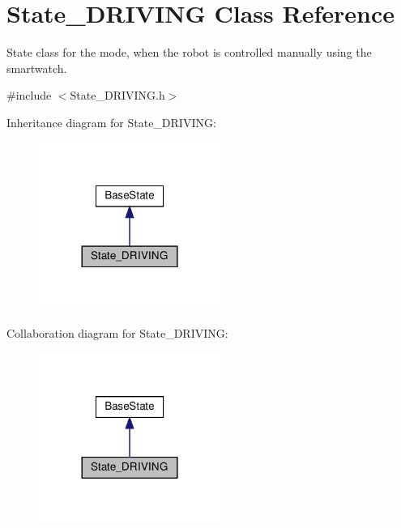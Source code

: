 \hypertarget{class_state___d_r_i_v_i_n_g}{}\section{State\+\_\+\+D\+R\+I\+V\+I\+NG Class Reference}
\label{class_state___d_r_i_v_i_n_g}


State class for the mode, when the robot is controlled manually using the smartwatch.  




{\ttfamily \#include $<$State\+\_\+\+D\+R\+I\+V\+I\+N\+G.\+h$>$}



Inheritance diagram for State\+\_\+\+D\+R\+I\+V\+I\+NG\+:\nopagebreak
\begin{figure}[H]
\begin{center}
\leavevmode
\includegraphics[width=168pt]{class_state___d_r_i_v_i_n_g__inherit__graph}
\end{center}
\end{figure}


Collaboration diagram for State\+\_\+\+D\+R\+I\+V\+I\+NG\+:\nopagebreak
\begin{figure}[H]
\begin{center}
\leavevmode
\includegraphics[width=168pt]{class_state___d_r_i_v_i_n_g__coll__graph}
\end{center}
\end{figure}
